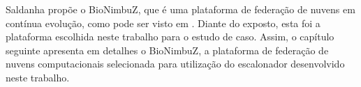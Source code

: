 Saldanha \cite{Saldanha_BioNimbus} propõe o BioNimbuZ, que é uma plataforma de federação de nuvens em contínua evolução, como pode ser visto em \cite{BioNimbuZ_Breno_Deric} \cite{BioNimbuZ_Closer} \cite{BioNimbuZ_6846526} \cite{6732620_BioNimbuZ_ACOsched} \cite{BioNimbuZ_Willian_C99} \cite{closer12_BioNimbuZ_AHP}. Diante do exposto, esta foi a plataforma escolhida neste trabalho para o estudo de caso. Assim, o capítulo seguinte apresenta em detalhes o BioNimbuZ, a plataforma de federação de nuvens computacionais selecionada para utilização do escalonador desenvolvido neste trabalho.

